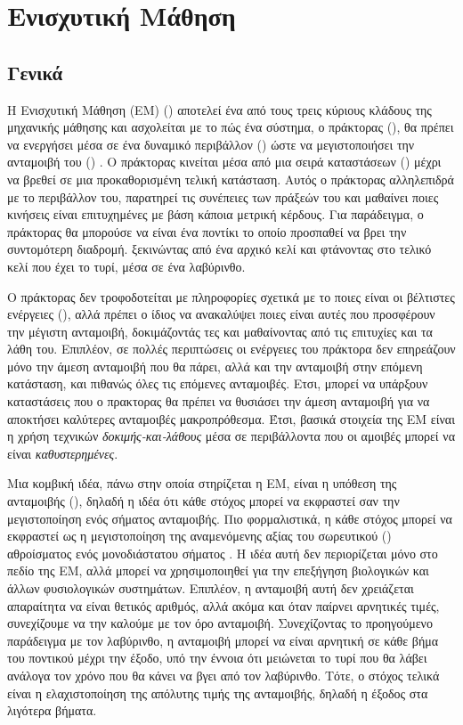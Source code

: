 \chapter{Ενισχυτική Μάθηση}
\label{chap:rl}
\section{Γενικά}

Η Ενισχυτική Μάθηση (ΕΜ) () αποτελεί ένα από τους τρεις κύριους κλάδους της μηχανικής
μάθησης και ασχολείται με το πώς ένα σύστημα, ο πράκτορας (), θα πρέπει να ενεργήσει μέσα σε ένα δυναμικό
περιβάλλον () ώστε να μεγιστοποιήσει την ανταμοιβή του () \cite{aigreek}. Ο πράκτορας κινείται μέσα από μια σειρά
καταστάσεων () μέχρι να βρεθεί σε μια προκαθορισμένη τελική κατάσταση\cite{drlmaze}.
Αυτός ο πράκτορας αλληλεπιδρά με το περιβάλλον του, παρατηρεί τις συνέπειες των πράξεών του και
μαθαίνει ποιες κινήσεις είναι επιτυχημένες με βάση κάποια μετρική κέρδους. Για παράδειγμα,
ο πράκτορας θα μπορούσε να είναι ένα ποντίκι το οποίο προσπαθεί να βρει την συντομότερη διαδρομή. ξεκινώντας από
ένα αρχικό κελί και φτάνοντας στο τελικό κελί που έχει το τυρί, μέσα σε ένα λαβύρινθο.

Ο πράκτορας δεν τροφοδοτείται με πληροφορίες σχετικά με το ποιες είναι οι βέλτιστες ενέργειες (),
αλλά πρέπει ο ίδιος να ανακαλύψει ποιες είναι αυτές που προσφέρουν την μέγιστη ανταμοιβή, δοκιμάζοντάς τες \cite{rlbook} και
μαθαίνοντας από τις επιτυχίες και τα λάθη του.
Επιπλέον, σε πολλές περιπτώσεις οι ενέργειες του πράκτορα δεν επηρεάζουν μόνο την άμεση ανταμοιβή που θα πάρει,
αλλά και την ανταμοιβή στην επόμενη κατάσταση, και πιθανώς όλες τις επόμενες ανταμοιβές. Ετσι, μπορεί να υπάρξουν
καταστάσεις που ο πρακτορας θα πρέπει να θυσιάσει την άμεση ανταμοιβή για να αποκτήσει καλύτερες ανταμοιβές μακροπρόθεσμα.
Έτσι, βασικά στοιχεία της ΕΜ είναι η χρήση τεχνικών \textit{δοκιμής-και-λάθους } μέσα σε περιβάλλοντα
που οι αμοιβές μπορεί να είναι \textit{καθυστερημένες}.

Μια κομβική ιδέα, πάνω στην οποία στηρίζεται η ΕΜ, είναι η υπόθεση της ανταμοιβής (), δηλαδή η ιδέα
ότι κάθε στόχος μπορεί να εκφραστεί σαν την μεγιστοποίηση ενός σήματος ανταμοιβής. Πιο φορμαλιστικά, η κάθε στόχος
μπορεί να εκφραστεί ως η μεγιστοποίηση της αναμενόμενης αξίας του σωρευτικού () αθροίσματος ενός μονοδιάστατου
σήματος \cite{rlbook}. Η ιδέα αυτή δεν περιορίζεται μόνο στο πεδίο της ΕΜ, αλλά μπορεί να χρησιμοποιηθεί για την επεξήγηση βιολογικών
και άλλων φυσιολογικών συστημάτων.
Επιπλέον, η ανταμοιβή αυτή δεν χρειάζεται απαραίτητα να είναι θετικός αριθμός, αλλά ακόμα και όταν παίρνει αρνητικές τιμές, συνεχίζουμε να την καλούμε
με τον όρο ανταμοιβή. Συνεχίζοντας το προηγούμενο παράδειγμα με τον λαβύρινθο, η ανταμοιβή μπορεί να είναι αρνητική σε κάθε βήμα του ποντικού
μέχρι την έξοδο, υπό την έννοια ότι μειώνεται το τυρί που θα λάβει ανάλογα τον χρόνο που θα κάνει να βγει από τον λαβύρινθο.
Τότε, ο στόχος τελικά είναι η ελαχιστοποίηση της απόλυτης τιμής της ανταμοιβής, δηλαδή η έξοδος στα λιγότερα βήματα.

